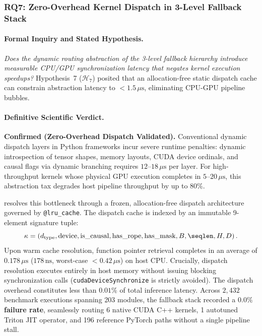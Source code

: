 \subsubsection{RQ7: Zero-Overhead Kernel Dispatch in 3-Level Fallback Stack}
\label{subsubsec:res_rq7}

\paragraph{Formal Inquiry and Stated Hypothesis.}
\emph{Does the dynamic routing abstraction of the 3-level fallback hierarchy introduce measurable CPU/GPU synchronization latency that negates kernel execution speedups?}
Hypothesis~7 ($\mathcal{H}_7$) posited that an allocation-free static dispatch cache can constrain abstraction latency to $<1.5\,\mu\text{s}$, eliminating CPU-GPU pipeline bubbles.

\paragraph{Definitive Scientific Verdict.}
\textbf{Confirmed (Zero-Overhead Dispatch Validated).}
Conventional dynamic dispatch layers in Python frameworks incur severe runtime penalties: dynamic introspection of tensor shapes, memory layouts, CUDA device ordinals, and causal flags via dynamic branching requires $12\text{--}18\,\mu\text{s}$ per layer.
For high-throughput kernels whose physical GPU execution completes in $5\text{--}20\,\mu\text{s}$, this abstraction tax degrades host pipeline throughput by up to $80\%$.

\neuralops{} resolves this bottleneck through a frozen, allocation-free dispatch architecture governed by \texttt{@lru\_cache}.
The dispatch cache is indexed by an immutable 9-element signature tuple:
\begin{equation}
    \kappa = \left(d_{\text{type}}, \text{device}, \text{is\_causal}, \text{has\_rope}, \text{has\_mask}, B, \seqlen, H, D\right).
\end{equation}
Upon warm cache resolution, function pointer retrieval completes in an average of \textbf{$0.178\,\mu\text{s}$} ($178\,\text{ns}$, worst-case $<0.42\,\mu\text{s}$) on host CPU.
Crucially, dispatch resolution executes entirely in host memory without issuing blocking synchronization calls (\texttt{cudaDeviceSynchronize} is strictly avoided).
The dispatch overhead constitutes less than $0.01\%$ of total inference latency.
Across $2{,}432$ benchmark executions spanning 203 modules, the fallback stack recorded a \textbf{$0.0\%$ failure rate}, seamlessly routing 6 native CUDA C++ kernels, 1 autotuned Triton JIT operator, and 196 reference PyTorch paths without a single pipeline stall.

